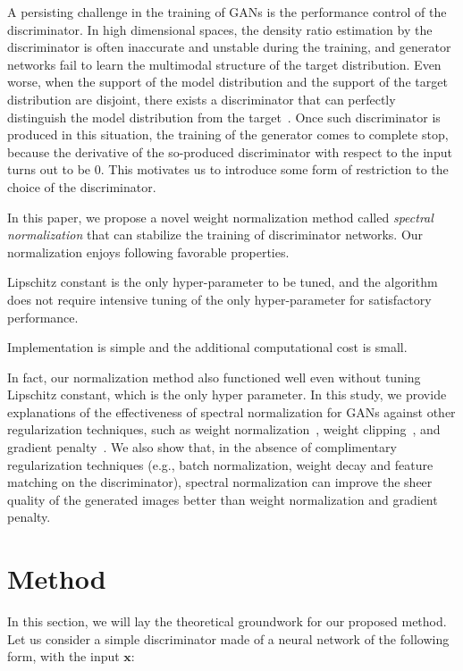 A persisting challenge in the training of GANs is the performance control of the discriminator. In high dimensional spaces, the density ratio estimation by the discriminator is often inaccurate and unstable during the training, and generator networks fail to learn the multimodal structure of the target distribution. Even worse, when the support of the model distribution and the support of the target distribution are disjoint, there exists a discriminator that can perfectly distinguish the model distribution from the target~\cite[]{arjovsky2017towards}.
Once such discriminator is produced in this situation, the training of the generator comes to complete stop, because the derivative of the so-produced discriminator with respect to the input turns out to be 0. This motivates us to introduce some form of restriction to the choice of the discriminator.

In this paper, we propose a novel weight normalization method called \textit{spectral normalization} that can stabilize the training of discriminator networks. Our normalization enjoys following favorable properties.
\begin{tight_itemize}
\item Lipschitz constant is the only hyper-parameter to be tuned, and the algorithm does not require intensive tuning of the only hyper-parameter for satisfactory performance.
\item Implementation is simple and the additional computational cost is small.
\end{tight_itemize}
In fact, our normalization method also functioned well even without tuning Lipschitz constant, which is the only hyper parameter. In this study, we provide explanations of the effectiveness of spectral normalization for GANs against other regularization techniques, such as weight normalization~\cite[]{salimans2016weight}, weight clipping~\cite[]{arjovsky2017wasserstein}, and gradient penalty~\cite[]{gulrajani2017improved}.
We also show that, in the absence of complimentary regularization techniques (e.g., batch normalization, weight decay and feature matching on the discriminator), spectral normalization can improve the sheer quality of the generated images better than weight normalization and gradient penalty.

\section{Method}
In this section, we will lay the theoretical groundwork for our proposed method. Let us consider a simple discriminator made of a neural network of the following form, with the input ${\bm x}$:

